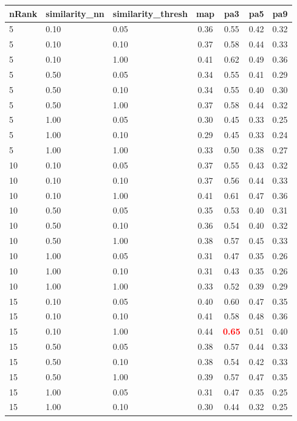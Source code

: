   
\begin{table} 
\begin{center} 
\scriptsize 
 \setlength{\tabcolsep}{.16667em} 
\begin{tabular}{lllcccc} 
nRank & similarity\_nn & similarity\_thresh & map & pa3 & pa5 & pa9 \\ 
\hline 
 5 & 0.10 & 0.05 & 0.36 & 0.55 & 0.42 & 0.32 \\ 
 5 & 0.10 & 0.10 & 0.37 & 0.58 & 0.44 & 0.33 \\ 
 5 & 0.10 & 1.00 & 0.41 & 0.62 & 0.49 & 0.36 \\ 
 5 & 0.50 & 0.05 & 0.34 & 0.55 & 0.41 & 0.29 \\ 
 5 & 0.50 & 0.10 & 0.34 & 0.55 & 0.40 & 0.30 \\ 
 5 & 0.50 & 1.00 & 0.37 & 0.58 & 0.44 & 0.32 \\ 
 5 & 1.00 & 0.05 & 0.30 & 0.45 & 0.33 & 0.25 \\ 
 5 & 1.00 & 0.10 & 0.29 & 0.45 & 0.33 & 0.24 \\ 
 5 & 1.00 & 1.00 & 0.33 & 0.50 & 0.38 & 0.27 \\ 
10 & 0.10 & 0.05 & 0.37 & 0.55 & 0.43 & 0.32 \\ 
10 & 0.10 & 0.10 & 0.37 & 0.56 & 0.44 & 0.33 \\ 
10 & 0.10 & 1.00 & 0.41 & 0.61 & 0.47 & 0.36 \\ 
10 & 0.50 & 0.05 & 0.35 & 0.53 & 0.40 & 0.31 \\ 
10 & 0.50 & 0.10 & 0.36 & 0.54 & 0.40 & 0.32 \\ 
10 & 0.50 & 1.00 & 0.38 & 0.57 & 0.45 & 0.33 \\ 
10 & 1.00 & 0.05 & 0.31 & 0.47 & 0.35 & 0.26 \\ 
10 & 1.00 & 0.10 & 0.31 & 0.43 & 0.35 & 0.26 \\ 
10 & 1.00 & 1.00 & 0.33 & 0.52 & 0.39 & 0.29 \\ 
15 & 0.10 & 0.05 & 0.40 & 0.60 & 0.47 & 0.35 \\ 
15 & 0.10 & 0.10 & 0.41 & 0.58 & 0.48 & 0.36 \\ 
15 & 0.10 & 1.00 & 0.44 & \textbf{\textcolor{red}{0.65}} & 0.51 & 0.40 \\ 
15 & 0.50 & 0.05 & 0.38 & 0.57 & 0.44 & 0.33 \\ 
15 & 0.50 & 0.10 & 0.38 & 0.54 & 0.42 & 0.33 \\ 
15 & 0.50 & 1.00 & 0.39 & 0.57 & 0.47 & 0.35 \\ 
15 & 1.00 & 0.05 & 0.31 & 0.47 & 0.35 & 0.25 \\ 
15 & 1.00 & 0.10 & 0.30 & 0.44 & 0.32 & 0.25 \\ 

\end{tabular}
\end{center}
\end{table}
